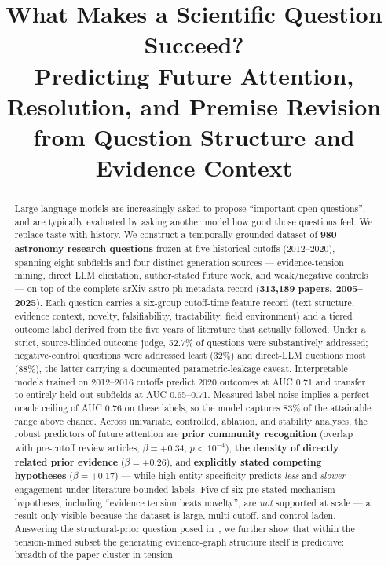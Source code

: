 \documentclass[11pt]{article}
\title{\bfseries What Makes a Scientific Question Succeed?\\[0.4em]
\large Predicting Future Attention, Resolution, and Premise Revision\\
from Question Structure and Evidence Context}
\author{}
\date{}
\newcommand{\addressedrate}{52.7\%}
\begin{document}
\maketitle

\begin{abstract}
\noindent
Large language models are increasingly asked to propose ``important open
questions'', and are typically evaluated by asking another model how good
those questions feel. We replace taste with history. We construct a
temporally grounded dataset of \textbf{980 astronomy research questions}
frozen at five historical cutoffs (2012--2020), spanning eight subfields
and four distinct generation sources --- evidence-tension mining, direct
LLM elicitation, author-stated future work, and weak/negative controls ---
on top of the complete arXiv astro-ph metadata record (\textbf{313{,}189
papers, 2005--2025}). Each question carries a six-group cutoff-time
feature record (text structure, evidence context, novelty, falsifiability,
tractability, field environment) and a tiered outcome label derived from
the five years of literature that actually followed. Under a strict,
source-blinded outcome judge, \addressedrate{} of questions were
substantively addressed; negative-control questions were addressed least
(32\%) and direct-LLM questions most (88\%), the latter carrying a
documented parametric-leakage caveat. Interpretable models trained on
2012--2016 cutoffs predict 2020 outcomes at AUC 0.71 and transfer to
entirely held-out subfields at AUC 0.65--0.71. Measured label noise
implies a perfect-oracle ceiling of AUC 0.76 on these labels, so the
model captures 83\% of the attainable range above chance. Across univariate,
controlled, ablation, and stability analyses, the robust predictors of
future attention are \textbf{prior community recognition} (overlap with
pre-cutoff review articles, $\beta = +0.34$, $p < 10^{-4}$), \textbf{the
density of directly related prior evidence} ($\beta = +0.26$), and
\textbf{explicitly stated competing hypotheses} ($\beta = +0.17$) ---
while high entity-specificity predicts \emph{less} and \emph{slower}
engagement under literature-bounded labels. Five of six pre-stated
mechanism hypotheses, including ``evidence tension beats novelty'', are
\emph{not} supported at scale --- a result only visible because the
dataset is large, multi-cutoff, and control-laden. Answering the
structural-prior question posed in~\cite{paper2}, we further show
that within the tension-mined subset the generating evidence-graph
structure itself is predictive: breadth of the paper cluster in tension

\end{abstract}
\end{document}
